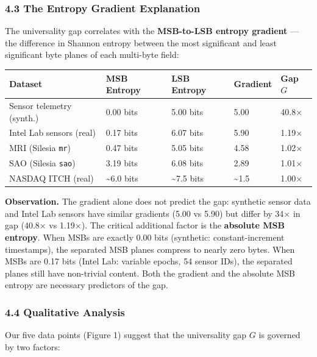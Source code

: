 \documentclass[
  11pt,
  letterpaper,
]{article}
\makeatletter
\renewcommand{\_}{\bpd@origunderscore\allowbreak}
\makeatother
\begin{document}
\hypertarget{the-entropy-gradient-explanation}{%
\subsubsection{4.3 The Entropy Gradient
Explanation}\label{the-entropy-gradient-explanation}}

The universality gap correlates with the \textbf{MSB-to-LSB entropy
gradient} --- the difference in Shannon entropy between the most
significant and least significant byte planes of each multi-byte field:

\begin{longtable}[]{@{}lllll@{}}
\toprule\noalign{}
Dataset & MSB Entropy & LSB Entropy & Gradient & Gap \(G\) \\
\midrule\noalign{}
\endhead
\bottomrule\noalign{}
\endlastfoot
Sensor telemetry (synth.) & 0.00 bits & 5.00 bits & 5.00 & 40.8× \\
Intel Lab sensors (real) & 0.17 bits & 6.07 bits & 5.90 & 1.19× \\
MRI (Silesia \texttt{mr}) & 0.47 bits & 5.05 bits & 4.58 & 1.02× \\
SAO (Silesia \texttt{sao}) & 3.19 bits & 6.08 bits & 2.89 & 1.01× \\
NAS\-DAQ ITCH (real) & \textasciitilde6.0 bits & \textasciitilde7.5 bits &
\textasciitilde1.5 & 1.00× \\
\end{longtable}

\textbf{Observation.} The gradient alone does not predict the gap:
synthetic sensor data and Intel Lab sensors have similar gradients (5.00
vs 5.90) but differ by 34× in gap (40.8× vs 1.19×). The critical
additional factor is the \textbf{absolute MSB entropy}. When MSBs are
exactly 0.00 bits (synthetic: constant-increment timestamps), the
separated MSB planes compress to nearly zero bytes. When MSBs are 0.17
bits (Intel Lab: variable epochs, 54 sensor IDs), the separated planes
still have non-trivial content. Both the gradient and the absolute MSB
entropy are necessary predictors of the gap.

\hypertarget{qualitative-analysis}{%
\subsubsection{4.4 Qualitative Analysis}\label{qualitative-analysis}}

Our five data points (Figure 1) suggest that the universality gap \(G\)
is governed by two factors:
\end{document}

